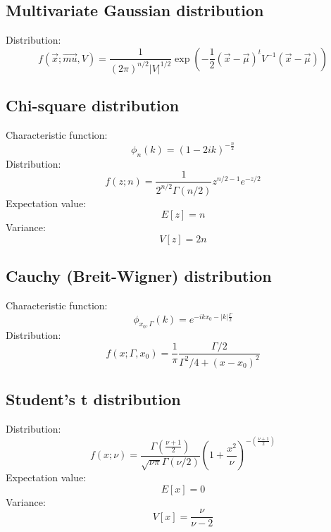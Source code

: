 \documentclass[12pt]{book}
\newcommand{\vx}{\vec{x}}
\begin{document}
\subsection{Multivariate Gaussian distribution}
Distribution:
\begin{equation}
	f(\vx;\vec{mu},V) = \frac{1}{(2\pi)^{n/2}|V|^{1/2}}\exp\left(-\frac{1}{2}(\vx - \vec{\mu})^tV^{-1}(\vx - \vec{\mu})\right)
\end{equation}
\subsection{Chi-square distribution}
Characteristic function:
\begin{equation}
	\phi_n(k)=\left(1-2ik\right)^{-\frac{n}{2}}
\end{equation}
Distribution:
\begin{equation}
	f(z;n) = \frac{1}{2^{n/2}\Gamma(n/2)}z^{n/2-1}e^{-z/2}
\end{equation}
Expectation value:
\begin{equation}
	E[z] = n
\end{equation}
Variance:
\begin{equation}
	V[z] = 2n
\end{equation}
\subsection{Cauchy (Breit-Wigner) distribution}
Characteristic function:
\begin{equation}
	\phi_{x_0,\Gamma}(k)=e^{-ikx_0-\left\lvert k\right\rvert \frac{\Gamma}{2}}
\end{equation}
Distribution:
\begin{equation}
	f(x;\Gamma,x_0) = \frac{1}{\pi}\frac{\Gamma/2}{\Gamma^2/4 + (x-x_0)^2}
\end{equation}
\subsection{Student's t distribution}
Distribution:
\begin{equation}
	f(x;\nu) = \frac{\Gamma\left(\frac{\nu+1}{2}\right)}{\sqrt{\nu\pi}\Gamma(\nu/2)}\left(1+ \frac{x^2}{\nu}\right)^{-\left(\frac{\nu+1}{2}\right)}
\end{equation}
Expectation value:
\begin{equation}
	E[x] = 0
\end{equation}
Variance:
\begin{equation}
	V[x] = \frac{\nu}{\nu-2}
\end{equation}
\end{document}
